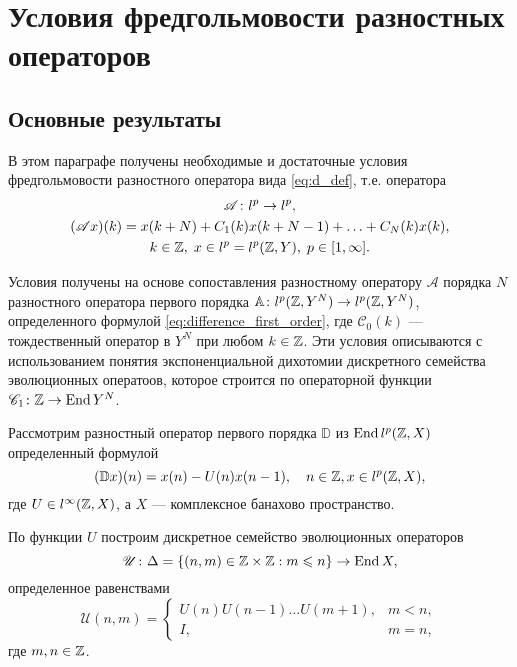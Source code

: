 \chapter{Условия фредгольмовости разностных операторов}\label{sec:fredhlom}
\section{Основные результаты}
В этом параграфе получены необходимые и достаточные условия фредгольмовости разностного оператора вида \eqref{eq:d_def}, т.е. оператора
\begin{gather*}
    \mathcal A \colon l^p  \to l^p, \\
    (\mathcal A x)(k) = x(k + N) + C_1(k) x(k + N - 1) + \dotsc + C_N(k) x(k), \\
    k \in \mathbb{Z}, \; x \in l^p = l^p(\mathbb{Z}, Y), \; p \in [1, \infty].
\end{gather*}

Условия получены на основе сопоставления разностному оператору $\mathcal A$ порядка $N$ разностного оператора первого порядка $ \mathbb A\colon l^p(\mathbb{Z}, Y^N) \to l^p(\mathbb{Z}, Y^N)$, определенного формулой \eqref{eq:difference_first_order}, где $\mathcal C_0(k)$ --- тождественный оператор в $Y^N$ при любом $k \in \mathbb{Z}$. Эти условия описываются с использованием понятия экспоненциальной дихотомии дискретного семейства эволюционных оператоов, которое строится по операторной функции $\mathcal C_1\colon \mathbb{Z} \to \operatorname{End}{Y^N}$.

Рассмотрим разностный оператор первого порядка $\mathbb D$ из $\operatorname{End} l^p(\mathbb{Z}, X)$ определенный формулой
\[ (\mathbb D x)(n) = x(n) - U(n)x(n - 1), \quad n \in \mathbb{Z}, x \in l^p(\mathbb{Z}, X), \]
где $U \in l^\infty(\mathbb{Z}, X)$, а $X$ --- комплексное банахово пространство.

По функции $U$ построим дискретное семейство эволюционных операторов
\[\mathcal U \colon \Delta = \left\{(n, m) \in \mathbb{Z} \times \mathbb{Z} : m \leqslant n\right\} \to \operatorname{End} X, \]
определенное равенствами
\[
    \mathcal U (n, m) = \begin{cases}
        U(n)U(n-1)\dotsc U(m+1), & m < n, \\
        I,                       & m = n,
    \end{cases}
\]
где $m, n \in \mathbb{Z}$.

